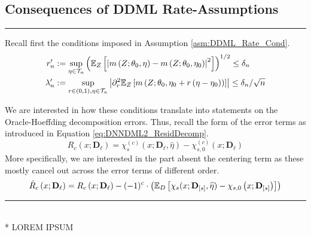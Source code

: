 \subsection{Consequences of DDML Rate-Assumptions}
\hrule

Recall first the conditions imposed in Assumption \ref{asm:DDML_Rate_Cond}.
\begin{align}
    r_{n}^{\prime}
    & :=\sup_{\eta \in \mathcal{T}_{n}}\left(\mathbb{E}_{Z}\left[\left|m\left(Z; \theta_0, \eta\right)-m\left(Z; \theta_0, \eta_0\right)\right|^2\right]\right)^{1 / 2} 
    \leq \delta_{n}\\
    \lambda_{n}^{\prime}
    & :=\sup_{r \in(0,1), \eta \in \mathcal{T}_{n}}\left|\partial_r^2 \mathbb{E}_{Z}\left[m\left(Z; \theta_0, \eta_0+r\left(\eta-\eta_0\right)\right)\right]\right| 
    \leq \delta_{n} / \sqrt{n}
\end{align}

We are interested in how these conditions translate into statements on the Oracle-Hoeffding decomposition errors.
Thus, recall the form of the error terms as introduced in Equation \ref{eq:DNNDML2_ResidDecomp}.
\begin{equation}
    R_{c}\left(x; \mathbf{D}_{\ell}\right) 
    = \chi_{s}^{(c)}\left(x; \mathbf{D}_{\ell}, \hat{\eta}\right) - \chi_{s,0}^{(c)}\left(x; \mathbf{D}_{\ell}\right)
\end{equation}
More specifically, we are interested in the part absent the centering term as these mostly cancel out across the error terms of different order.
\begin{equation}
    \tilde{R}_{c}\left(x; \mathbf{D}_{\ell}\right)
    = R_{c}\left(x; \mathbf{D}_{\ell}\right) - (-1)^{c} \cdot \left(\mathbb{E}_{D}\left[\chi_{s}(x; \mathbf{D}_{[s]}, \widehat{\eta}) - \chi_{s,0}\left(x; \mathbf{D}_{[s]}\right)\right]\right)
\end{equation}

\hrule

\begin{lem}[]\label{lem:rate_cond_errors1}\mbox{}\\*
    {\color{red} LOREM IPSUM}
\end{lem}

